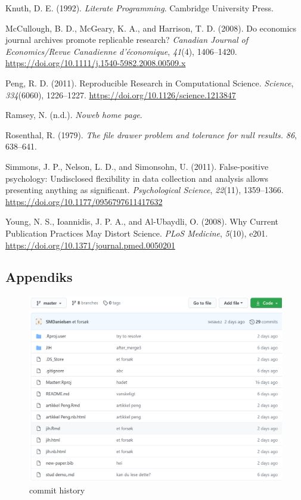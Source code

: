 \documentclass[
  12pt,
]{article}
\begin{document}
\leavevmode\hypertarget{ref-knuth1992}{}%
Knuth, D. E. (1992). \emph{Literate Programming}. Cambridge University
Press.

\leavevmode\hypertarget{ref-mccullough2008}{}%
McCullough, B. D., McGeary, K. A., and Harrison, T. D. (2008). Do
economics journal archives promote replicable research? \emph{Canadian
Journal of Economics/Revue Canadienne d'économique}, \emph{41}(4),
1406--1420. \url{https://doi.org/10.1111/j.1540-5982.2008.00509.x}

\leavevmode\hypertarget{ref-peng2011}{}%
Peng, R. D. (2011). Reproducible Research in Computational Science.
\emph{Science}, \emph{334}(6060), 1226--1227.
\url{https://doi.org/10.1126/science.1213847}

\leavevmode\hypertarget{ref-ramsey}{}%
Ramsey, N. (n.d.). \emph{Noweb home page}.

\leavevmode\hypertarget{ref-rosenthal1979}{}%
Rosenthal, R. (1979). \emph{The file drawer problem and tolerance for
null results.} \emph{86}, 638--641.

\leavevmode\hypertarget{ref-simmons2011}{}%
Simmons, J. P., Nelson, L. D., and Simonsohn, U. (2011). False-positive
psychology: Undisclosed flexibility in data collection and analysis
allows presenting anything as significant. \emph{Psychological Science},
\emph{22}(11), 1359--1366.
\url{https://doi.org/10.1177/0956797611417632}

\leavevmode\hypertarget{ref-young2008}{}%
Young, N. S., Ioannidis, J. P. A., and Al-Ubaydli, O. (2008). Why
Current Publication Practices May Distort Science. \emph{PLoS Medicine},
\emph{5}(10), e201. \url{https://doi.org/10.1371/journal.pmed.0050201}

\hypertarget{appendiks}{%
\subsection{Appendiks}\label{appendiks}}

\begin{figure}
\centering
\includegraphics{commit.png}
\caption{commit history}
\end{figure}
\end{document}
